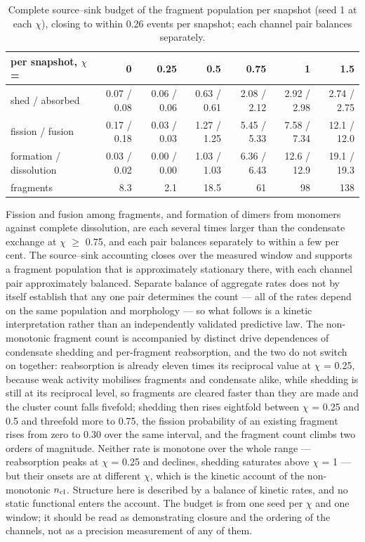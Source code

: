 \documentclass[aps,pre,preprint,superscriptaddress,nofootinbib,longbibliography]{revtex4-2}
\begin{document}
\begin{table}[htbp]
\caption{Complete source--sink budget of the fragment population per snapshot (seed 1 at each $\chi$), closing to within 0.26 events per snapshot; each channel pair balances separately.}
\label{tab:5}
\begin{ruledtabular}
\begin{tabular}{lrrrrrr}
per snapshot, $\chi$ = & 0 & 0.25 & 0.5 & 0.75 & 1 & 1.5 \\
\hline
shed / absorbed & 0.07 / 0.08 & 0.06 / 0.06 & 0.63 / 0.61 & 2.08 / 2.12 & 2.92 / 2.98 & 2.74 / 2.75 \\
fission / fusion & 0.17 / 0.18 & 0.03 / 0.03 & 1.27 / 1.25 & 5.45 / 5.33 & 7.58 / 7.34 & 12.1 / 12.0 \\
formation / dissolution & 0.03 / 0.02 & 0.00 / 0.00 & 1.03 / 1.03 & 6.36 / 6.43 & 12.6 / 12.9 & 19.1 / 19.3 \\
fragments & 8.3 & 2.1 & 18.5 & 61 & 98 & 138 \\
\end{tabular}
\end{ruledtabular}
\end{table}

Fission and fusion among fragments, and formation of dimers from monomers against complete dissolution, are each several times larger than the condensate exchange at $\chi$ $\ge$ 0.75, and each pair balances separately to within a few per cent. The source--sink accounting closes over the measured window and supports a fragment population that is approximately stationary there, with each channel pair approximately balanced. Separate balance of aggregate rates does not by itself establish that any one pair determines the count --- all of the rates depend on the same population and morphology --- so what follows is a kinetic interpretation rather than an independently validated predictive law. The non-monotonic fragment count is accompanied by distinct drive dependences of condensate shedding and per-fragment reabsorption, and the two do not switch on together: reabsorption is already eleven times its reciprocal value at $\chi$ = 0.25, because weak activity mobilises fragments and condensate alike, while shedding is still at its reciprocal level, so fragments are cleared faster than they are made and the cluster count falls fivefold; shedding then rises eightfold between $\chi$ = 0.25 and 0.5 and threefold more to 0.75, the fission probability of an existing fragment rises from zero to 0.30 over the same interval, and the fragment count climbs two orders of magnitude. Neither rate is monotone over the whole range --- reabsorption peaks at $\chi$ = 0.25 and declines, shedding saturates above $\chi$ = 1 --- but their onsets are at different $\chi$, which is the kinetic account of the non-monotonic $n_{\rm cl}$. Structure here is described by a balance of kinetic rates, and no static functional enters the account. The budget is from one seed per $\chi$ and one window; it should be read as demonstrating closure and the ordering of the channels, not as a precision measurement of any of them.
\end{document}
